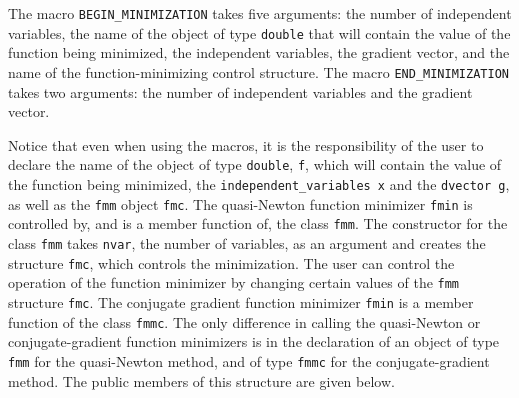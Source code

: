\documentclass{admbmanual}
\begin{document}
The macro \texttt{BEGIN\_MINIMIZATION} takes five arguments: the number of
independent variables, the name of the object of type \texttt{double}
that will contain the value of the function being minimized,
the independent variables, the gradient vector, and the name of 
the function-minimizing control structure.
The macro \texttt{END\_MINIMIZATION} takes two arguments: the number of
independent variables and the gradient vector. 

Notice that even when using the macros, it is the responsibility of the
user to declare 
the name of the object of type \texttt{double}, \texttt{f},
which will contain the value of the function being minimized, the 
\texttt{independent\_variables x} and the \texttt{dvector g}, as well
as the \texttt{fmm} object \texttt{fmc}.
The quasi-Newton function minimizer \texttt{fmin} is 
controlled by, and is a member function 
of, the class \texttt{fmm}. The constructor for the
class \texttt{fmm} takes \texttt{nvar}, the number of variables,
as an argument and creates the structure \texttt{fmc}, which controls 
the minimization.  The user can control the operation of the 
function minimizer by changing certain values of the \texttt{fmm}
structure \texttt{fmc}.
The conjugate gradient function minimizer \texttt{fmin} is
a member function of the class \texttt{fmmc}.
The only difference in calling the quasi-Newton or conjugate-gradient 
function minimizers is in the declaration of an
object of type \texttt{fmm} for the quasi-Newton method, and
of type \texttt{fmmc} for the conjugate-gradient method.
The public members of this structure are given below. 
\end{document}

